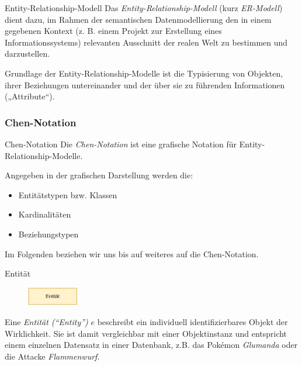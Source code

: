 \begin{defi}{Entity-Relationship-Modell}
    Das \emph{Entity-Relationship-Modell} (kurz \emph{ER-Modell}) dient dazu, im Rahmen der semantischen Datenmodellierung den in einem gegebenen Kontext (z. B. einem Projekt zur Erstellung eines Informationssystems) relevanten Ausschnitt der realen Welt zu bestimmen und darzustellen.

    Grundlage der Entity-Relationship-Modelle ist die Typisierung von Objekten, ihrer Beziehungen untereinander und der über sie zu führenden Informationen („Attribute“).
\end{defi}

\subsubsection{Chen-Notation}

\begin{defi}{Chen-Notation}
    Die \emph{Chen-Notation} ist eine grafische Notation für Entity-Relationship-Modelle.

    Angegeben in der grafischen Darstellung werden die:
    \begin{itemize}
        \item Entitätstypen bzw. Klassen
        \item Kardinalitäten
        \item Beziehungstypen
    \end{itemize}

    Im Folgenden beziehen wir uns bis auf weiteres auf die Chen-Notation.
\end{defi}

\begin{defi}{Entität}
    \begin{figure}
        \begin{center}
            \includegraphics[width=0.2\textwidth]{includes/figures/definition_entity_relationship_model_entity.pdf}
        \end{center}
    \end{figure}
    Eine \emph{Entität (\enquote{Entity})} $e$ beschreibt ein individuell identifizierbares Objekt der Wirklichkeit.
    Sie ist damit vergleichbar mit einer Objektinstanz und entspricht einem einzelnen Datensatz in einer Datenbank, z.B. das Pokémon \emph{Glumanda} oder die Attacke \emph{Flammenwurf}.
\end{defi}

